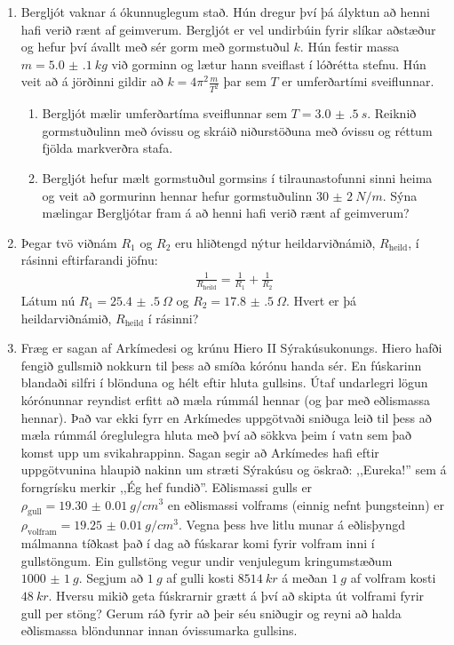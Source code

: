 \ifdefined \wholebook \else\documentclass[oneside]{book}\usepackage{EdlBook}\graphicspath{{figures/}}
\begin{document}
\begin{enumerate}[label = \textbf{Dæmi \thechapter.\arabic*.}]
\item Bergljót vaknar á ókunnuglegum stað. Hún dregur því þá ályktun að henni hafi verið rænt af geimverum. Bergljót er vel undirbúin fyrir slíkar aðstæður og hefur því ávallt með sér gorm með gormstuðul $k$. Hún festir massa $m = \SI{5.0(1)}{kg}$ við gorminn og lætur hann sveiflast í lóðrétta stefnu. Hún veit að á jörðinni gildir að $k = 4\pi^2\frac{m}{T^2}$ þar sem $T$ er umferðartími sveiflunnar.
\begin{enumerate}[label = \textbf{(\alph*)}]
    \item Bergljót mælir umferðartíma sveiflunnar sem $T = \SI{3.0(5)}{s}$. Reiknið gormstuðulinn með óvissu og skráið niðurstöðuna með óvissu og réttum fjölda markverðra stafa.
    
    \item Bergljót hefur mælt gormstuðul gormsins í tilraunastofunni sinni heima og veit að gormurinn hennar hefur gormstuðulinn $\SI{30(2)}{N/m}$. Sýna mælingar Bergljótar fram á að henni hafi verið rænt af geimverum?
\end{enumerate}

\item Þegar tvö viðnám $R_1$ og $R_2$ eru hliðtengd nýtur heildarviðnámið, $R_{\text{heild}}$, í rásinni eftirfarandi jöfnu:
\begin{align*}
    \frac{1}{R_{\text{heild}}} = \frac{1}{R_1} + \frac{1}{R_2}
\end{align*}
Látum nú $R_1 = \SI{25.4(5)}{\Omega}$ og $R_2 = \SI{17.8(5)}{\Omega}$. Hvert er þá heildarviðnámið, $R_{\text{heild}}$ í rásinni?

\item Fræg er sagan af Arkímedesi og krúnu Hiero II Sýrakúsukonungs. Hiero hafði fengið gullsmið nokkurn til þess að smíða kórónu handa sér. En fúskarinn blandaði silfri í blönduna og hélt eftir hluta gullsins. Útaf undarlegri lögun kórónunnar reyndist erfitt að mæla rúmmál hennar (og þar með eðlismassa hennar). Það var ekki fyrr en Arkímedes uppgötvaði sniðuga leið til þess að mæla rúmmál óreglulegra hluta með því að sökkva þeim í vatn sem það komst upp um svikahrappinn.
Sagan segir að Arkímedes hafi eftir uppgötvunina hlaupið nakinn um stræti Sýrakúsu og öskrað: ,,Eureka!'' sem á forngrísku merkir ,,Ég hef fundið''. Eðlismassi gulls er $\rho_\text{gull} =  \SI{19.30(1)}{g/cm^3}$ en eðlismassi volframs (einnig nefnt þungsteinn) er $\rho_{\text{volfram}} = \SI{19.25(1)}{g/cm^3}$. Vegna þess hve litlu munar á eðlisþyngd málmanna tíðkast það í dag að fúskarar komi fyrir volfram inni í gullstöngum. Ein gullstöng vegur undir venjulegum kringumstæðum $\SI{1000(1)}{g}$.
Segjum að $\SI{1}{g}$ af gulli kosti $\SI{8514}{kr}$ á meðan $\SI{1}{g}$ af volfram kosti $\SI{48}{kr}$. Hversu mikið geta fúskrarnir grætt á því að skipta út volframi fyrir gull per stöng? Gerum ráð fyrir að þeir séu sniðugir og reyni að halda eðlismassa blöndunnar innan óvissumarka gullsins.

\end{enumerate}

\newpage




\ifdefined \wholebook \else
 \printindex
\end{document}

